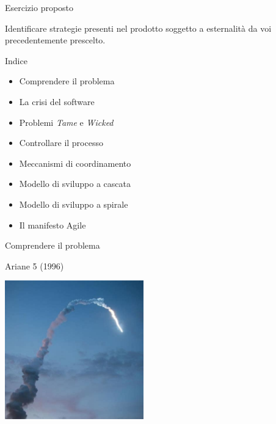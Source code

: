 \documentclass{beamer}
\begin{document}
\begin{frame}
{\centerline{Esercizio proposto}}
\vspace{1cm}
\begin{center}
    \LARGE{Identificare strategie presenti nel prodotto soggetto a esternalit\`{a} da voi precedentemente prescelto.}
\end{center}

\end{frame}

\begin{frame}
{\centerline{Indice}}
\begin{itemize}
    \item Comprendere il problema
    \item La crisi del software
    \item Problemi \textit{Tame} e \textit{Wicked}
    \item Controllare il processo
    \item Meccanismi di coordinamento
    \item Modello di sviluppo a cascata
    \item Modello di sviluppo a spirale
    \item Il manifesto Agile
\end{itemize} 
\end{frame}

\begin{frame}{\centerline{Comprendere il problema}}

\begin{center}
{\Large
Ariane 5 (1996)\\
}
\end{center}
\begin{center}
\includegraphics[width=60mm]{P2023.AIBCCSS.IlConcettoDiSoftware/Ariane5.jpeg}
\end{center}

\end{frame}
\end{document}
